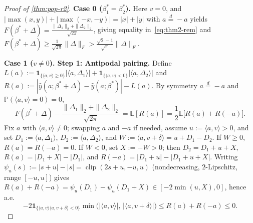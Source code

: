 \documentclass[11pt]{article}
\theoremstyle{plain}
\theoremstyle{remark}
\numberwithin{equation}{section}
\newcommand{\E}{\mathbb{E}}
\newcommand{\Prob}{\mathbb{P}}
\newcommand{\ind}{\mathbf{1}}
\newcommand{\ip}[2]{\langle #1, #2 \rangle}
\newcommand{\norm}[1]{\|#1\|}
\newcommand{\Fnorm}[1]{\|#1\|_F}
\begin{document}
\begin{proof}[Proof of \cref{thm:pop-r2}]
\textbf{Case 0 ($\beta_1^* = \beta_2^*$).} Here $v = 0$, and $|\max(x, y)| + |\max(-x, -y)| = |x| + |y|$ with $a \stackrel{d}{=} -a$ yields $F(\beta^* + \Delta) = \frac{\norm{\Delta_1}_2 + \norm{\Delta_2}_2}{\sqrt{2\pi}}$, giving equality in~\eqref{eq:thm2-rem} and $F(\beta^* + \Delta) \ge \frac{1}{\sqrt{2\pi}}\Fnorm{\Delta} > \frac{\sqrt{2}-1}{\sqrt{\pi}}\Fnorm{\Delta}$.

\textbf{Case 1 ($v \ne 0$). Step 1: Antipodal pairing.}
Define $L(a) := \ind_{\{\ip{a}{v} \ge 0\}}|\ip{a}{\Delta_1}| + \ind_{\{\ip{a}{v} < 0\}}|\ip{a}{\Delta_2}|$ and $R(a) := |\hat y(a; \beta^* + \Delta) - \hat y(a; \beta^*)| - L(a)$. By symmetry $a \stackrel{d}{=} -a$ and $\Prob(\ip{a}{v} = 0) = 0$,
\begin{equation}
  \label{eq:r2-pair-exp}
  F(\beta^* + \Delta) - \frac{\norm{\Delta_1}_2 + \norm{\Delta_2}_2}{\sqrt{2\pi}}
  = \E[R(a)] = \frac{1}{2}\E\bigl[R(a) + R(-a)\bigr].
\end{equation}
Fix $a$ with $\ip{a}{v} \ne 0$; swapping $a$ and $-a$ if needed, assume $u := \ip{a}{v} > 0$, and set $D_1 := \ip{a}{\Delta_1}$, $D_2 := \ip{a}{\Delta_2}$, and $W := \ip{a}{v + \delta} = u + D_1 - D_2$. If $W \ge 0$, $R(a) = R(-a) = 0$. If $W < 0$, set $X := -W > 0$; then $D_2 = D_1 + u + X$, $R(a) = |D_1 + X| - |D_1|$, and $R(-a) = |D_1 + u| - |D_1 + u + X|$. Writing $\psi_u(s) := |s + u| - |s| = \operatorname{clip}(2s + u, -u, u)$ (nondecreasing, $2$-Lipschitz, range $[-u, u]$) gives $R(a) + R(-a) = \psi_u(D_1) - \psi_u(D_1 + X) \in [-2\min(u, X), 0]$, hence a.e.
\begin{equation}
  \label{eq:r2-sandwich}
  -2\ind_{\{\ip{a}{v}\ip{a}{v+\delta} < 0\}} \min\bigl(|\ip{a}{v}|,\, |\ip{a}{v+\delta}|\bigr)
  \le R(a) + R(-a) \le 0.
\end{equation}


\end{proof}
\end{document}
